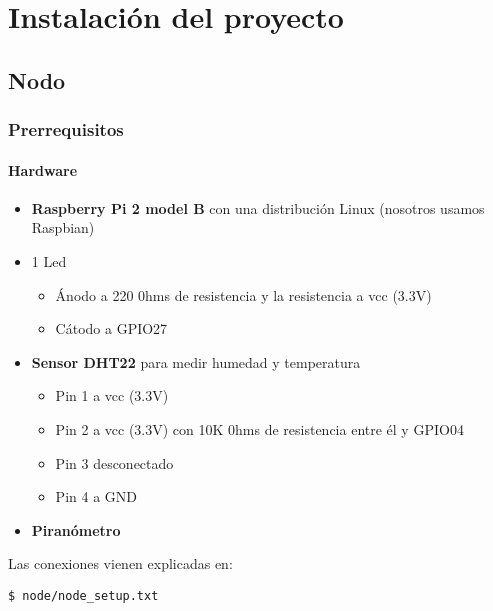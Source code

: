 \cleardoublepage

\chapter{Instalación del proyecto}
\label{makereference6}

\section{Nodo}
\subsection{Prerrequisitos}
\subsubsection{Hardware}
	\begin{itemize}
		\item \textbf{Raspberry Pi 2 model B} con una distribución Linux (nosotros usamos Raspbian)
		\item 1 Led
			\begin{itemize}
				\item Ánodo a 220 0hms de resistencia y la resistencia a vcc (3.3V)
				\item Cátodo a GPIO27
			\end{itemize}
		\item \textbf{Sensor DHT22} para medir humedad y temperatura
			\begin{itemize}
				\item Pin 1 a vcc (3.3V)
				\item Pin 2 a vcc (3.3V) con 10K 0hms de resistencia entre él y GPIO04
				\item Pin 3 desconectado
				\item Pin 4 a GND
			\end{itemize}
		\item \textbf{Piranómetro}
	\end{itemize}

	Las conexiones vienen explicadas en:
\lstset{language=bash}
\begin{lstlisting}[frame=single]
$ node/node_setup.txt
\end{lstlisting}

